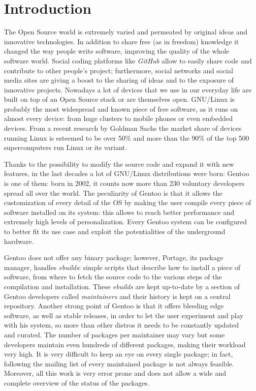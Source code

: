 \chapter{Introduction}

The Open Source world is extremely varied and permeated by original ideas and innovative technologies. In addition to share free (as in freedom) knowledge it changed the way people write software, improving the quality of the whole software world.
Social coding platforms like \emph{GitHub} allow to easily share code and contribute to other people's project; furthermore, social networks and social media sites are giving a boost to the sharing of ideas and to the exposure of innovative projects.
Nowadays a lot of devices that we use in our everyday life are built on top of an Open Source stack or are themselves open. GNU/Linux is probably the most widespread and known piece of free software, as it runs on almost every device: from huge clusters to mobile phones or even embedded devices. From a recent research by Goldman Sachs the market share of devices running Linux is esteemed to be over 50\%\cite{goldmansachs_microsoft} and more than the 90\% of the top 500 supercomputers run Linux or its variant\cite{top500}.

Thanks to the possibility to modify the source code and expand it with new features, in the last decades a lot of GNU/Linux distributions were born: Gentoo is one of them: born in 2002, it counts now more than 230 voluntary developers spread all over the world. The peculiarity of Gentoo is that it allows the customization of every detail of the OS by making the user compile every piece of software installed on its system: this allows to reach better performance and extremely high levels of personalization. Every Gentoo system can be configured to better fit its use case and exploit the potentialities of the underground hardware.

Gentoo does not offer any binary package; however, Portage, its package manager, handles \emph{ebuilds}: simple scripts that describe how to install a piece of software, from where to fetch the source code to the various steps of the compilation and installation. These \emph{ebuilds} are kept up-to-date by a section of Gentoo developers called \emph{maintainers} and their history is kept on a central repository. Another strong point of Gentoo is that it offers bleeding edge software, as well as stable releases, in order to let the user experiment and play with his system, so more than other distros it needs to be constantly updated and curated.
The number of packages per maintainer may vary but some developers maintain even hundreds of different packages, making their workload very high. It is very difficult to keep an eye on every single package; in fact, following the mailing list of every maintained package is not always feasible. Moreover, all this work is very error prone and does not allow a wide and complete overview of the status of the packages.

